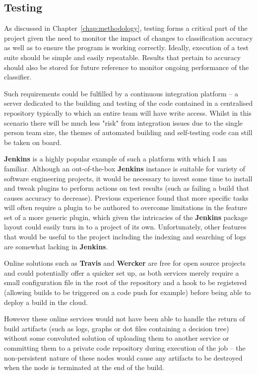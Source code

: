 \subsection{Testing}
\label{sec:part1:testing}

As discussed in Chapter~\ref{chap:methodology}, testing forms a critical part of
the project given the need to monitor the impact of changes to classification
accuracy as well as to ensure the program is working correctly. Ideally,
execution of a test suite should be simple and easily repeatable. Results that
pertain to accuracy should also be stored for future reference to monitor
ongoing performance of the classifier.

Such requirements could be fulfilled by a continuous integration platform -- a
server dedicated to the building and testing of the code contained in a
centralised repository typically to which an entire team will have write
access\citep{fowler-ci}. Whilst in this scenario there will be much less "risk"
from integration issues due to the single person team size, the themes of
automated building and self-testing code can still be taken on board.

\textbf{Jenkins}\citep{Jenkins} is a highly popular\cite{jenkins-stats} example
of such a platform with which I am familiar. Although an out-of-the-box
\textbf{Jenkins} instance is suitable for variety of software engineering
projects, it would be necessary to invest some time to install and tweak plugins
to perform actions on test results (such as failing a build that causes accuracy
to decrease).  Previous experience found that more specific tasks will often
require a plugin to be authored to overcome limitations in the feature set of a
more generic plugin, which given the intricacies of the \textbf{Jenkins} package
layout could easily turn in to a project of its own. Unfortunately, other
features that would be useful to the project including the indexing and
searching of logs are somewhat lacking in \textbf{Jenkins}.

Online solutions such as \textbf{Travis}\citep{travis-ci} and
\textbf{Wercker}\citep{wercker} are free for open source projects and could
potentially offer a quicker set up, as both services merely require a small
configuration file in the root of the repository and a hook to be registered
(allowing builds to be triggered on a code push for example) before being able
to deploy a build in the cloud.

However these online services would not have been able to handle the return of
build artifacts (such as logs, graphs or dot files containing a decision tree)
without some convoluted solution of uploading them to another service or
committing them to a private code repository during execution of the job -- the
non-persistent nature of these nodes would cause any artifacts to be destroyed
when the node is terminated at the end of the build.

